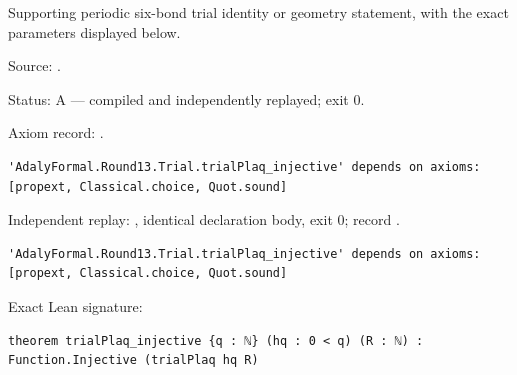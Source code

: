 \begin{theorem}[bp-384]
\label{bp-384}
\leanok
Supporting periodic six-bond trial identity or geometry statement, with the exact parameters displayed below.

\par Source: \texttt{}.
\par Status: A — compiled and independently replayed; exit 0.
\par Axiom record: \texttt{}.
\begin{verbatim}
'AdalyFormal.Round13.Trial.trialPlaq_injective' depends on axioms: [propext, Classical.choice, Quot.sound]
\end{verbatim}
\par Independent replay: \texttt{}, identical declaration body, exit 0; record \texttt{}.
\begin{verbatim}
'AdalyFormal.Round13.Trial.trialPlaq_injective' depends on axioms: [propext, Classical.choice, Quot.sound]
\end{verbatim}
\par Exact Lean signature:
\begin{verbatim}
theorem trialPlaq_injective {q : ℕ} (hq : 0 < q) (R : ℕ) : Function.Injective (trialPlaq hq R)
\end{verbatim}
\end{theorem}

